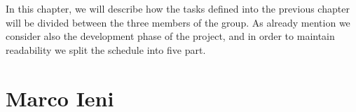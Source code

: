 In this chapter, we will describe how the tasks defined into the previous chapter will be divided between the three members of the group. As already mention we consider also the development phase of the project, and in order to maintain readability we split the schedule into five part.

\section{Marco Ieni}
\begin{center}
\end{center}

\begin{center}
\end{center}

\begin{center}
\end{center}

\begin{center}
\end{center}

